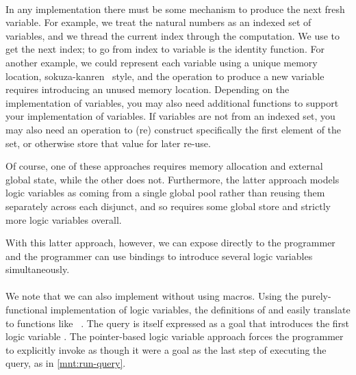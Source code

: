 \documentclass[sigplan,draft,balance,pbalance,natbib=false]{acmart}
\begin{document}
\paragraph{}

In any implementation there must be some mechanism to produce the next
fresh variable. For example, we treat the natural numbers as an
indexed set of variables, and we thread the current index through the
computation. We use  to get the next index; to go
from index to variable is the identity function. For another example,
we could represent each variable using a unique memory location,
sokuza-kanren~\cite{kiselyov2006taste} style, and the operation to
produce a new variable requires introducing an unused memory location.
Depending on the implementation of variables, you may also need
additional functions to support your implementation of variables. If
variables are not from an indexed set, you may also need an operation
to (re) construct specifically the first element of the set, or
otherwise store that value for later re-use.

Of course, one of these approaches requires memory allocation and
external global state, while the other does not. Furthermore, the
latter approach models logic variables as coming from a single global
pool rather than reusing them separately across each disjunct, and so
requires some global store and strictly more logic variables overall.

With this latter approach, however, we can expose 
directly to the programmer and the programmer can use 
bindings to introduce several logic variables simultaneously.

\paragraph{}

We note that we can also implement  without using
macros. Using the purely-functional implementation of logic variables,
the definitions of  and  easily
translate to functions
like ~\cite{hemann2013muKanren}. The
query is itself expressed as a goal that introduces the first logic
variable . The pointer-based logic variable approach
forces the programmer to explicitly invoke  as
though it were a goal as the last step of executing the query, as in
\cref{mnt:run-query}.
\end{document}
